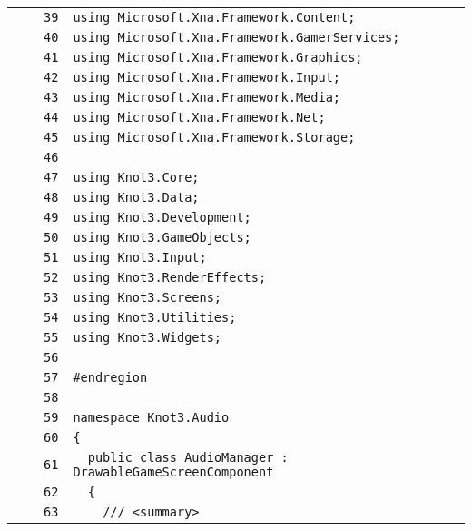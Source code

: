 \documentclass[a4paper,10pt]{article}
\begin{document}
\begin{longtable}[l]{lrrl}
\cellcolor{gray} &  & \verb~39~ & \verb~using Microsoft.Xna.Framework.Content;~\\
\cellcolor{gray} &  & \verb~40~ & \verb~using Microsoft.Xna.Framework.GamerServices;~\\
\cellcolor{gray} &  & \verb~41~ & \verb~using Microsoft.Xna.Framework.Graphics;~\\
\cellcolor{gray} &  & \verb~42~ & \verb~using Microsoft.Xna.Framework.Input;~\\
\cellcolor{gray} &  & \verb~43~ & \verb~using Microsoft.Xna.Framework.Media;~\\
\cellcolor{gray} &  & \verb~44~ & \verb~using Microsoft.Xna.Framework.Net;~\\
\cellcolor{gray} &  & \verb~45~ & \verb~using Microsoft.Xna.Framework.Storage;~\\
\cellcolor{gray} &  & \verb~46~ & \verb~~\\
\cellcolor{gray} &  & \verb~47~ & \verb~using Knot3.Core;~\\
\cellcolor{gray} &  & \verb~48~ & \verb~using Knot3.Data;~\\
\cellcolor{gray} &  & \verb~49~ & \verb~using Knot3.Development;~\\
\cellcolor{gray} &  & \verb~50~ & \verb~using Knot3.GameObjects;~\\
\cellcolor{gray} &  & \verb~51~ & \verb~using Knot3.Input;~\\
\cellcolor{gray} &  & \verb~52~ & \verb~using Knot3.RenderEffects;~\\
\cellcolor{gray} &  & \verb~53~ & \verb~using Knot3.Screens;~\\
\cellcolor{gray} &  & \verb~54~ & \verb~using Knot3.Utilities;~\\
\cellcolor{gray} &  & \verb~55~ & \verb~using Knot3.Widgets;~\\
\cellcolor{gray} &  & \verb~56~ & \verb~~\\
\cellcolor{gray} &  & \verb~57~ & \verb~#endregion~\\
\cellcolor{gray} &  & \verb~58~ & \verb~~\\
\cellcolor{gray} &  & \verb~59~ & \verb~namespace Knot3.Audio~\\
\cellcolor{gray} &  & \verb~60~ & \verb~{~\\
\cellcolor{gray} &  & \verb~61~ & \verb~  public class AudioManager : DrawableGameScreenComponent~\\
\cellcolor{gray} &  & \verb~62~ & \verb~  {~\\
\cellcolor{gray} &  & \verb~63~ & \verb~    /// <summary>~\\

\end{longtable}
\end{document}
